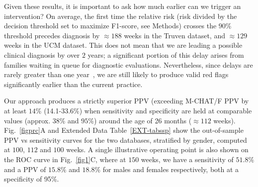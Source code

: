 \documentclass[onecolumn,,10pt]{IEEEtran}
\begin{document}



Given these results, it is important to ask how much earlier can we trigger an intervention? On average,  the first time the relative risk (risk divided by the decision threshold set to maximize F1-score, see Methods) crosses the $90\%$ threshold precedes  diagnosis by  $\approx 188$ weeks in the Truven dataset, and $\approx 129$ weeks in the UCM dataset.
This does not mean that we are   leading a possible clinical diagnosis by over $2$ years; a significant portion of this delay arises from families waiting in queue for diagnostic evaluations. Nevertheless, since delays are rarely greater than   one year~\cite{gordon2016whittling},  we are still likely to produce valid red flags significantly earlier than the current practice.%

Our approach produces a strictly superior PPV (exceeding M-CHAT/F PPV by at  least $14\%$ (14.1-33.6\%) when sensitivity and specificity are held at comparable values (approx. $38\%$ and $95\%$) around the age of 26 months ($\approx 112$ weeks). Fig.~\ref{figprc}A and Extended Data Table~\ref{EXT-tabssp} show  the out-of-sample  PPV vs sensitivity curves   for the two databases, stratified by gender, computed at $100$, $112$ and $100$ weeks. A single illustrative operating point is also shown on the ROC curve in Fig.~\ref{fig1}C, where at $150$ weeks, we have a sensitivity of $51.8\%$ and a PPV of $15.8\%$ and $18.8\%$ for males and females respectively, both at a specificity of 95\%. 
\end{document}
